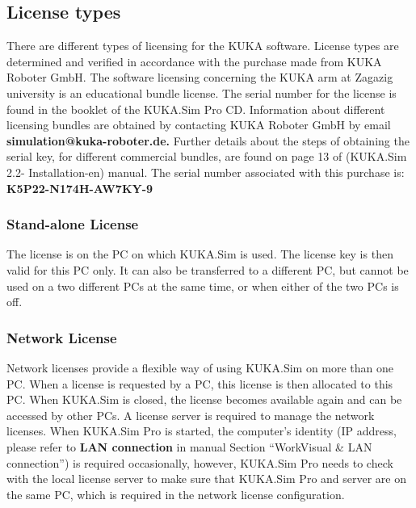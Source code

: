  	\subsection{License types}
 	There are different types of licensing for the KUKA software. License types are determined and verified in accordance with the purchase made from KUKA Roboter GmbH. 
 	The software licensing concerning the KUKA arm at Zagazig university is an educational bundle license. The serial number for the license is found in the booklet of the KUKA.Sim Pro CD. Information about different licensing bundles are obtained by contacting KUKA Roboter GmbH by email
 	\textbf {simulation@kuka-roboter.de.}
 	Further details about the steps of obtaining the serial key, for different commercial bundles,  are found on page 13 of (KUKA.Sim 2.2- Installation-en) manual.
 	The serial number associated with this purchase is: \textbf {K5P22-N174H-AW7KY-9}
 	
 		\subsubsection{Stand-alone License}
 		The license is on the PC on which KUKA.Sim is used. The license key is then valid for this PC only. It can also be transferred to a different PC, but cannot be used on a two different PCs at the same time, or when either of the two PCs is off.
 		
 		\subsubsection{Network License}
 		Network licenses provide a flexible way of using KUKA.Sim on more than one PC. When a license is requested by a PC, this license is then allocated to this PC. When KUKA.Sim is closed, the license becomes available again and can be accessed by other PCs. 
 		A license server is required to manage the network licenses. When KUKA.Sim Pro is started, the computer’s identity (IP address, please refer to \textbf {LAN connection} in manual Section “WorkVisual \& LAN connection”) is required occasionally, however, KUKA.Sim Pro needs to check with the local license server to make sure that KUKA.Sim Pro and server are on the same PC, which is required in the network license configuration.
 	
